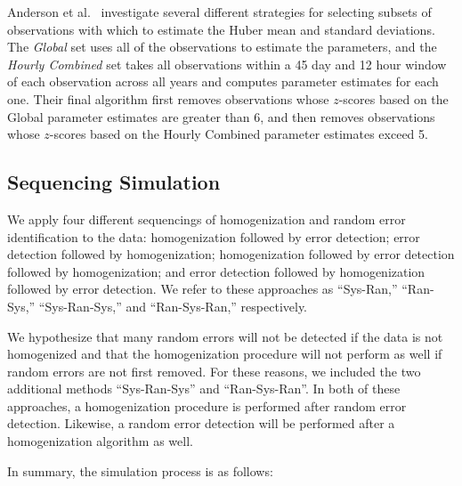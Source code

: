 \documentclass[12pt]{article}
\begin{document}
\begin{doublespacing}
Anderson et al.~\cite{bell14} investigate several different strategies for selecting subsets of observations with which to estimate the Huber mean and standard deviations.  The \emph{Global} set uses all of the observations to estimate the parameters, and the \emph{Hourly Combined} set takes all observations within  a 45 day and 12 hour window of each observation across all years and computes parameter estimates for each one.  Their final algorithm first removes observations whose $z$-scores based on the Global parameter estimates are greater than 6, and then removes observations whose $z$-scores  based on the Hourly Combined parameter estimates exceed 5.  


\subsection{Sequencing Simulation}

We apply four different sequencings of homogenization and random error identification to the data: homogenization followed by error detection; error detection followed by homogenization; homogenization followed by error detection followed by homogenization; and error detection followed by homogenization followed by error detection.  We refer to these approaches as ``Sys-Ran,'' ``Ran-Sys,'' ``Sys-Ran-Sys,'' and ``Ran-Sys-Ran,'' respectively.

We hypothesize that many random errors will not be detected if the data is not homogenized and that the homogenization procedure will not perform as well if random errors are not first removed.  For these reasons, we included the two additional methods ``Sys-Ran-Sys'' and ``Ran-Sys-Ran''.  In both of these approaches, a homogenization procedure is performed after random error detection.  Likewise, a random error detection will be performed after a homogenization algorithm as well.

In summary, the simulation process is as follows:


\end{doublespacing}
\end{document}
